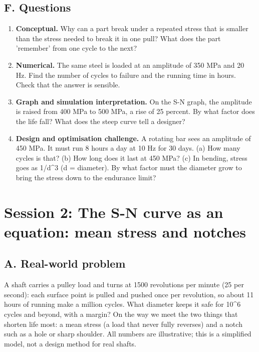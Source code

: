 \documentclass[11pt,a4paper]{article}
\begin{document}
\subsection*{F. Questions}
\begin{enumerate}[nosep]
\item \textbf{Conceptual.} Why can a part break under a repeated stress that is smaller than the stress needed to break it in one pull? What does the part 'remember' from one cycle to the next?
\item \textbf{Numerical.} The same steel is loaded at an amplitude of 350 MPa and 20 Hz. Find the number of cycles to failure and the running time in hours. Check that the answer is sensible.
\item \textbf{Graph and simulation interpretation.} On the S-N graph, the amplitude is raised from 400 MPa to 500 MPa, a rise of 25 percent. By what factor does the life fall? What does the steep curve tell a designer?
\item \textbf{Design and optimisation challenge.} A rotating bar sees an amplitude of 450 MPa. It must run 8 hours a day at 10 Hz for 30 days. (a) How many cycles is that? (b) How long does it last at 450 MPa? (c) In bending, stress goes as 1/d\textasciicircum{}3 (d = diameter). By what factor must the diameter grow to bring the stress down to the endurance limit?
\end{enumerate}

\section{Session 2: The S-N curve as an equation: mean stress and notches}

\subsection*{A. Real-world problem}
A shaft carries a pulley load and turns at 1500 revolutions per minute (25 per second): each surface point is pulled and pushed once per revolution, so about 11 hours of running make a million cycles. What diameter keeps it safe for 10\textasciicircum{}6 cycles and beyond, with a margin? On the way we meet the two things that shorten life most: a mean stress (a load that never fully reverses) and a notch such as a hole or sharp shoulder. All numbers are illustrative; this is a simplified model, not a design method for real shafts.
\end{document}
